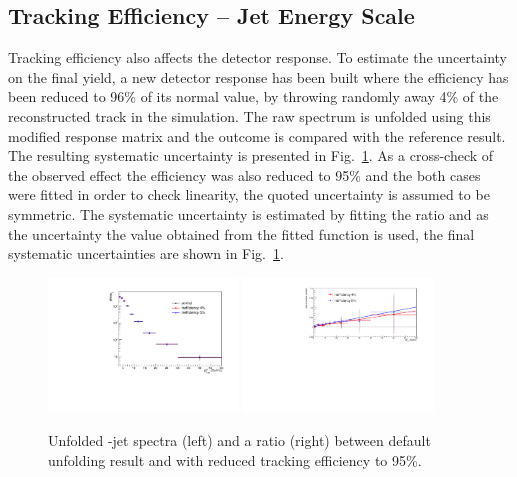 \subsection{Tracking Efficiency -- Jet Energy Scale}


Tracking efficiency also affects the detector response. To estimate the uncertainty on the final yield, a new detector response has been built where the efficiency has been reduced to 96\% of its normal value, by throwing randomly away 4\% of the reconstructed track in the simulation.
The raw spectrum is unfolded using this modified response matrix and the outcome is compared with the reference result. The resulting systematic uncertainty is presented in Fig.~\ref{fig:JESsys_Dzero}. As a cross-check of the observed effect the efficiency was also reduced to 95\% and the both cases were fitted in order to check linearity, the quoted uncertainty is assumed to be symmetric. 
The systematic uncertainty is estimated by fitting the ratio and as the uncertainty the value obtained from the fitted function is used, the final systematic uncertainties are shown in Fig.~\ref{fig:JESsys_Dzero}.


\begin{figure}[bth]
\centering
\includegraphics[width=0.45\textwidth]{pPbcuts_2sig/JES/JES_reg4}
\includegraphics[width=0.45\textwidth]{pPbcuts_2sig/JES/JES_reg4_ratio}
\caption{Unfolded \Dzero-jet spectra (left) and a ratio (right) between default unfolding result and with reduced tracking efficiency to 95\%.}
\label{fig:JESsys_Dzero}
\end{figure}



